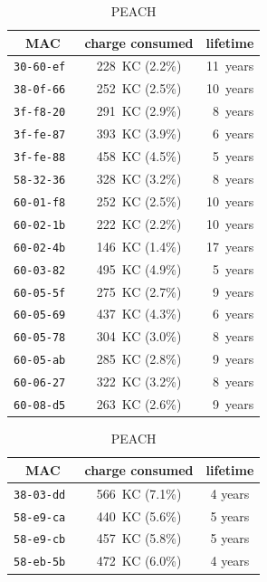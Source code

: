 \documentclass{elsarticle}
\begin{document}
\begin{table}
\begin{subtable}{.4\textwidth}
    \begin{tabular}{|c|c|r|}
        \toprule
        MAC    & charge consumed           &   lifetime \\
        \midrule
        \tt{30-60-ef}  & 228~KC (2.2\%) & 11~years \\
        \tt{38-0f-66}  & 252~KC (2.5\%) & 10~years \\
        \tt{3f-f8-20}  & 291~KC (2.9\%) & 8~years \\
        \tt{3f-fe-87}  & 393~KC (3.9\%) & 6~years \\
        \tt{3f-fe-88}  & 458~KC (4.5\%) & 5~years \\
        \tt{58-32-36}  & 328~KC (3.2\%) & 8~years \\
        \tt{60-01-f8}  & 252~KC (2.5\%) & 10~years \\
        \tt{60-02-1b}  & 222~KC (2.2\%) & 10~years \\
        \tt{60-02-4b}  & 146~KC (1.4\%) & 17~years \\
        \tt{60-03-82}  & 495~KC (4.9\%) & 5~years \\
        \tt{60-05-5f}  & 275~KC (2.7\%) & 9~years \\
        \tt{60-05-69}  & 437~KC (4.3\%) & 6~years \\
        \tt{60-05-78}  & 304~KC (3.0\%) & 8~years \\
        \tt{60-05-ab}  & 285~KC (2.8\%) & 9~years \\
        \tt{60-06-27}  & 322~KC (3.2\%) & 8~years \\
        \tt{60-08-d5}  & 263~KC (2.6\%) & 9~years \\
        \bottomrule
    \end{tabular}
    \caption{PEACH}
\end{subtable}\hfill
\begin{subtable}{.45\textwidth}
    \begin{tabular}{|c|c|c|}
        \toprule
        MAC &  charge consumed & lifetime \\
        \midrule
        \tt{38-03-dd} &  566~KC (7.1\%)  &  4 years \\
        \tt{58-e9-ca} &  440~KC (5.6\%)  &  5 years \\
        \tt{58-e9-cb} &  457~KC (5.8\%)  &  5 years \\
        \tt{58-eb-5b} &  472~KC (6.0\%)  &  4 years \\

\end{tabular}
\end{subtable}
\end{table}
\end{document}
